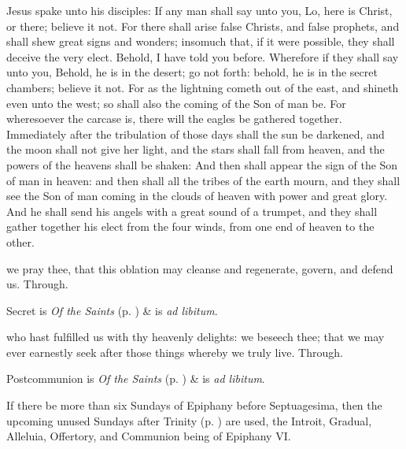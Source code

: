  Jesus spake unto his disciples: If any man shall say unto you, Lo, here is Christ, or there; believe it not. For there shall arise false Christs, and false prophets, and shall shew great signs and wonders; insomuch that, if it were possible, they shall deceive the very elect. Behold, I have told you before. Wherefore if they shall say unto you, Behold, he is in the desert; go not forth: behold, he is in the secret chambers; believe it not. For as the lightning cometh out of the east, and shineth even unto the west; so shall also the coming of the Son of man be. For wheresoever the carcase is, there will the eagles be gathered together. Immediately after the tribulation of those days shall the sun be darkened, and the moon shall not give her light, and the stars shall fall from heaven, and the powers of the heavens shall be shaken: And then shall appear the sign of the Son of man in heaven: and then shall all the tribes of the earth mourn, and they shall see the Son of man coming in the clouds of heaven with power and great glory. And he shall send his angels with a great sound of a trumpet, and they shall gather together his elect from the four winds, from one end of heaven to the other.

\secret
{} we pray thee, that this oblation may cleanse and regenerate, govern, and defend us. Through.
\begin{rubric}
     Secret is \emph{Of the Saints} (p. \pageref{SPSaints}) \&  is \emph{ad libitum}.
\end{rubric}
\postcommunion
{} who hast fulfilled us with thy heavenly delights: we beseech thee; that we may ever earnestly seek after those things whereby we truly live. Through.
\begin{rubric}
     Postcommunion is \emph{Of the Saints} (p. \pageref{SPSaints}) \&  is \emph{ad libitum}.
\end{rubric}
\begin{rubric}
    If there be more than six Sundays of Epiphany before Septuagesima, then the upcoming unused Sundays after Trinity (p. \pageref{trinity}) are used, the Introit, Gradual, Alleluia, Offertory, and Communion being of Epiphany VI.
\end{rubric}

